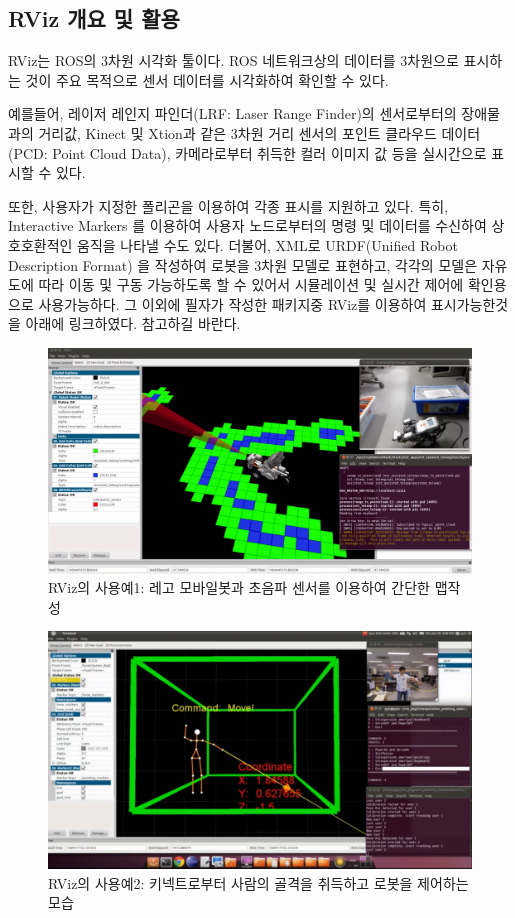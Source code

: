 \subsection{RViz 개요 및 활용}

RViz는 ROS의 3차원 시각화 툴이다. ROS 네트워크상의 데이터를 3차원으로 표시하는 것이 주요 목적으로 센서 데이터를 시각화하여 확인할 수 있다. 

예를들어, 레이저 레인지 파인더(LRF: Laser Range Finder)의 센서로부터의 장애물과의 거리값, Kinect 및 Xtion과 같은 3차원 거리 센서의 포인트 클라우드 데이터 (PCD: Point Cloud Data), 카메라로부터 취득한 컬러 이미지 값 등을 실시간으로 표시할 수 있다. 

또한, 사용자가 지정한 폴리곤을 이용하여 각종 표시를 지원하고 있다. 특히, Interactive Markers 를 이용하여 사용자 노드로부터의 명령 및 데이터를 수신하여 상호호환적인 움직을 나타낼 수도 있다. 더불어, XML로 URDF(Unified Robot Description Format) 을 작성하여 로봇을 3차원 모델로 표현하고, 각각의 모델은 자유도에 따라 이동 및 구동 가능하도록 할 수 있어서 시뮬레이션 및 실시간 제어에 확인용으로 사용가능하다. 그 이외에 필자가 작성한 패키지중 RViz를 이용하여 표시가능한것을 아래에 링크하였다. 참고하길 바란다.

\begin{figure}[h]
\centering\includegraphics[width=0.7\columnwidth]{pictures/chapter6/rviz_example1.png}
\caption{RViz의 사용예1: 레고 모바일봇과 초음파 센서를 이용하여 간단한 맵작성}
\end{figure}

\begin{figure}[h]
\centering\includegraphics[width=0.7\columnwidth]{pictures/chapter6/rviz_example2.png}
\caption{RViz의 사용예2: 키넥트로부터 사람의 골격을 취득하고 로봇을 제어하는 모습}
\end{figure}

